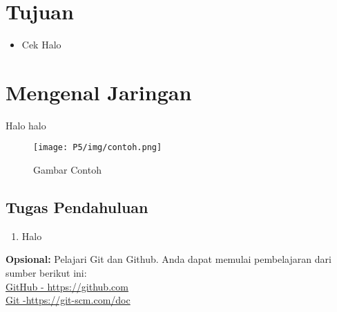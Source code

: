 \section{Tujuan}
\begin{itemize}[label=$\bullet$, itemsep=-1pt, leftmargin=*]
    \item Cek Halo
\end{itemize}

\section{Mengenal Jaringan}
Halo halo

\begin{figure}[H]
    \centering
    \texttt{[image: P5/img/contoh.png]}
    \caption{Gambar Contoh}
    \label{fig:gambarcontoh}
\end{figure}

\subsection{Tugas Pendahuluan}
\begin{enumerate}
    \item Halo
\end{enumerate}


\begin{center}
    \colorbox{cyan!30}{\parbox{0.8\linewidth}{\textbf{Opsional:} Pelajari Git dan Github. Anda dapat memulai pembelajaran dari sumber berikut ini: \\ \href{https://github.com}{GitHub - https://github.com} \\ \href{https://git-scm.com/doc}{Git -https://git-scm.com/doc}}}
\end{center}